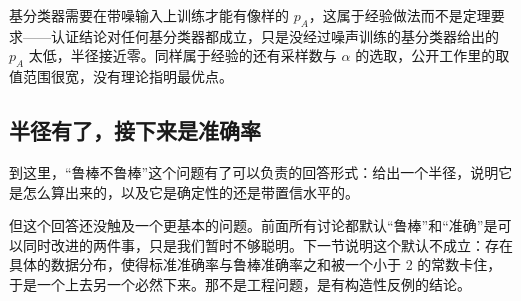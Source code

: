 \begin{remark}
基分类器需要在带噪输入上训练才能有像样的 \(p_A\)，这属于经验做法而不是定理要求——认证结论对任何基分类器都成立，只是没经过噪声训练的基分类器给出的 \(p_A\) 太低，半径接近零。同样属于经验的还有采样数与 \(\alpha\) 的选取，公开工作里的取值范围很宽，没有理论指明最优点。
\end{remark}

\subsection{半径有了，接下来是准确率}

到这里，``鲁棒不鲁棒''这个问题有了可以负责的回答形式：给出一个半径，说明它是怎么算出来的，以及它是确定性的还是带置信水平的。

但这个回答还没触及一个更基本的问题。前面所有讨论都默认``鲁棒''和``准确''是可以同时改进的两件事，只是我们暂时不够聪明。下一节说明这个默认不成立：存在具体的数据分布，使得标准准确率与鲁棒准确率之和被一个小于 2 的常数卡住，于是一个上去另一个必然下来。那不是工程问题，是有构造性反例的结论。
